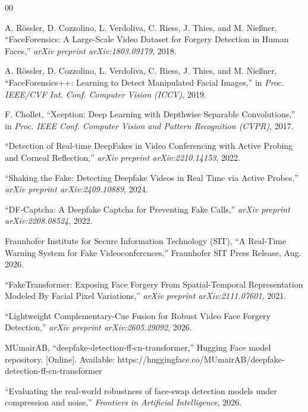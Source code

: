 \documentclass[conference]{IEEEtran}
\begin{document}
\begin{thebibliography}{00}

A. R\"ossler, D. Cozzolino, L. Verdoliva, C. Riess, J. Thies, and M. Nie{\ss}ner, ``FaceForensics: A Large-Scale Video Dataset for Forgery Detection in Human Faces,'' \emph{arXiv preprint arXiv:1803.09179}, 2018.

A. R\"ossler, D. Cozzolino, L. Verdoliva, C. Riess, J. Thies, and M. Nie{\ss}ner, ``FaceForensics++: Learning to Detect Manipulated Facial Images,'' in \emph{Proc. IEEE/CVF Int. Conf. Computer Vision (ICCV)}, 2019.

F. Chollet, ``Xception: Deep Learning with Depthwise Separable Convolutions,'' in \emph{Proc. IEEE Conf. Computer Vision and Pattern Recognition (CVPR)}, 2017.

``Detection of Real-time DeepFakes in Video Conferencing with Active Probing and Corneal Reflection,'' \emph{arXiv preprint arXiv:2210.14153}, 2022.

``Shaking the Fake: Detecting Deepfake Videos in Real Time via Active Probes,'' \emph{arXiv preprint arXiv:2409.10889}, 2024.

``DF-Captcha: A Deepfake Captcha for Preventing Fake Calls,'' \emph{arXiv preprint arXiv:2208.08524}, 2022.

Fraunhofer Institute for Secure Information Technology (SIT), ``A Real-Time Warning System for Fake Videoconferences,'' Fraunhofer SIT Press Release, Aug. 2026.

``FakeTransformer: Exposing Face Forgery From Spatial-Temporal Representation Modeled By Facial Pixel Variations,'' \emph{arXiv preprint arXiv:2111.07601}, 2021.

``Lightweight Complementary-Cue Fusion for Robust Video Face Forgery Detection,'' \emph{arXiv preprint arXiv:2605.29092}, 2026.

MUmairAB, ``deepfake-detection-ff-cn-transformer,'' Hugging Face model repository. [Online]. Available: https://huggingface.co/MUmairAB/deepfake-detection-ff-cn-transformer

``Evaluating the real-world robustness of face-swap detection models under compression and noise,'' \emph{Frontiers in Artificial Intelligence}, 2026.


\end{thebibliography}
\end{document}
